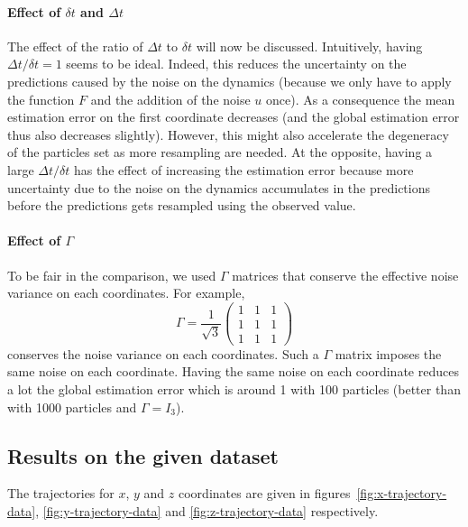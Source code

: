 \documentclass[english, DIV=13]{scrartcl}
\begin{document}
\paragraph{Effect of $\delta t$ and $\Delta t$}
The effect of the ratio of $\Delta t$ to $\delta t$ will now be discussed. Intuitively,
having $\Delta t/\delta t = 1$ seems to be ideal. Indeed, this reduces the uncertainty
on the predictions caused by the noise on the dynamics (because we only have to apply
the function $F$ and the addition of the noise $u$ once). As a consequence the mean
estimation error on the first coordinate decreases (and the global estimation error
thus also decreases slightly).
However, this might also accelerate the degeneracy of the particles set as more
resampling are needed. At the opposite, having a large $\Delta t/\delta t$ has the
effect of increasing the estimation error because more uncertainty due to the noise on
the dynamics accumulates in the predictions before the predictions gets resampled using
the observed value.

\paragraph{Effect of $\Gamma$}
To be fair in the comparison, we used $\Gamma$ matrices that conserve the effective
noise variance on each coordinates. For example,
\begin{equation*}
    \Gamma = \frac{1}{\sqrt{3}}
    \begin{pmatrix}
        1 & 1 & 1 \\
        1 & 1 & 1 \\
        1 & 1 & 1
    \end{pmatrix}
\end{equation*}
conserves the noise variance on each coordinates. Such a $\Gamma$ matrix imposes the
same noise on each coordinate. Having the same noise on each coordinate reduces a lot
the global estimation error which is around 1 with 100 particles (better than with
1000 particles and $\Gamma = I_3$).

\subsection{Results on the given dataset}
The trajectories for $x$, $y$ and $z$ coordinates are given in
figures~\ref{fig:x-trajectory-data}, \ref{fig:y-trajectory-data} and
\ref{fig:z-trajectory-data} respectively.
\end{document}
